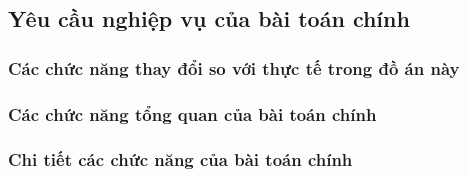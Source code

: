 \documentclass{report} %
\begin{document}
\subsection{Yêu cầu nghiệp vụ của bài toán chính}
\subsubsection{Các chức năng thay đổi so với thực tế trong đồ án này}

\subsubsection{Các chức năng tổng quan của bài toán chính}
\subsubsection{Chi tiết các chức năng của bài toán chính}
\end{document}
